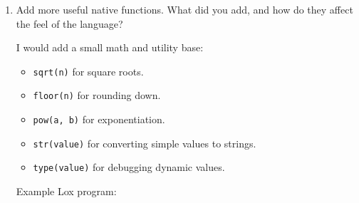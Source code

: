 \documentclass{article}
\begin{document}
\begin{enumerate}
{        \begin{verbatim}
typedef bool (*NativeFn)(int argCount, Value* args);

static bool clockNative(int argCount, Value* args) {
  args[-1] = NUMBER_VAL((double)clock() / CLOCKS_PER_SEC);
  return true;
}

static bool sqrtNative(int argCount, Value* args) {
  if (!IS_NUMBER(args[0])) {
    args[-1] = OBJ_VAL(copyString("sqrt() expects a number.", 24));
    return false;
  }

  args[-1] = NUMBER_VAL(sqrt(AS_NUMBER(args[0])));
  return true;
}
        \end{verbatim}

        The VM then keeps the return value in the callee's old stack slot on success,
        or prints the message from that slot on failure:

        \begin{verbatim}
if (native->function(argCount, vm.stackTop - argCount)) {
  vm.stackTop -= argCount;
  return true;
}

runtimeError(AS_CSTRING(vm.stackTop[-argCount - 1]));
return false;
        \end{verbatim}

        This adds a branch to every native call, so a native-call microbenchmark would
        get slower. I still think it is the right tradeoff because a real standard
        library needs to reject bad dynamic values safely instead of letting C code
        crash or read invalid memory.
    }

    \item {
        Add more useful native functions. What did you add, and how do they affect the
        feel of the language?

        I would add a small math and utility base:

        \begin{itemize}
            \item \texttt{sqrt(n)} for square roots.
            \item \texttt{floor(n)} for rounding down.
            \item \texttt{pow(a, b)} for exponentiation.
            \item \texttt{str(value)} for converting simple values to strings.
            \item \texttt{type(value)} for debugging dynamic values.
        \end{itemize}

        Example Lox program:

}
\end{enumerate}
\end{document}
